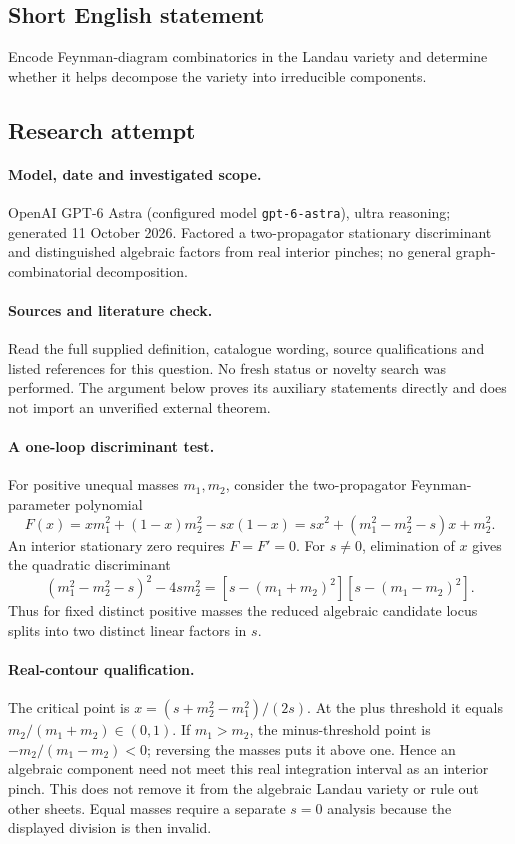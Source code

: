 \documentclass[11pt]{article}
\begin{document}
\subsection{Short English statement}
Encode Feynman-diagram combinatorics in the Landau variety and determine whether it helps decompose the variety into irreducible components.
\subsection{Research attempt}
\paragraph{Model, date and investigated scope.}
OpenAI GPT-6 Astra (configured model \texttt{gpt-6-astra}), ultra reasoning; generated 11 October 2026. Factored a two-propagator stationary discriminant and distinguished algebraic factors from real interior pinches; no general graph-combinatorial decomposition.

\paragraph{Sources and literature check.}
Read the full supplied definition, catalogue wording, source qualifications and listed references for this question. No fresh status or novelty search was performed. The argument below proves its auxiliary statements directly and does not import an unverified external theorem.

\paragraph{A one-loop discriminant test.} For positive unequal masses \(m_1,m_2\), consider the two-propagator Feynman-parameter polynomial
\[
 F(x)=xm_1^2+(1-x)m_2^2-sx(1-x)
 =sx^2+(m_1^2-m_2^2-s)x+m_2^2.
\]
An interior stationary zero requires \(F=F'=0\). For \(s\ne0\), elimination of \(x\) gives the quadratic discriminant
\[
 (m_1^2-m_2^2-s)^2-4sm_2^2
 =[s-(m_1+m_2)^2][s-(m_1-m_2)^2].
\]
Thus for fixed distinct positive masses the reduced algebraic candidate locus splits into two distinct linear factors in \(s\).
\paragraph{Real-contour qualification.} The critical point is \(x=(s+m_2^2-m_1^2)/(2s)\). At the plus threshold it equals \(m_2/(m_1+m_2)\in(0,1)\). If \(m_1>m_2\), the minus-threshold point is \(-m_2/(m_1-m_2)<0\); reversing the masses puts it above one. Hence an algebraic component need not meet this real integration interval as an interior pinch. This does not remove it from the algebraic Landau variety or rule out other sheets. Equal masses require a separate \(s=0\) analysis because the displayed division is then invalid.
\end{document}
